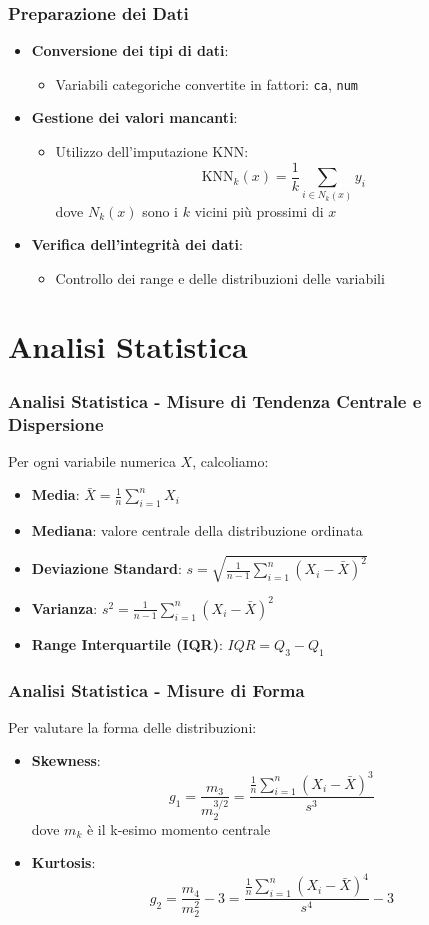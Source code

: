 \documentclass{beamer}
\begin{document}
\begin{frame}
\frametitle{Preparazione dei Dati}
\begin{itemize}
    \item \textbf{Conversione dei tipi di dati}:
    \begin{itemize}
        \item Variabili categoriche convertite in fattori: \texttt{ca}, \texttt{num}
    \end{itemize}
    \item \textbf{Gestione dei valori mancanti}:
    \begin{itemize}
        \item Utilizzo dell'imputazione KNN:
        \[\text{KNN}_k(x) = \frac{1}{k}\sum_{i \in N_k(x)} y_i\]
        dove $N_k(x)$ sono i $k$ vicini più prossimi di $x$
    \end{itemize}
    \item \textbf{Verifica dell'integrità dei dati}:
    \begin{itemize}
        \item Controllo dei range e delle distribuzioni delle variabili
    \end{itemize}
\end{itemize}
\end{frame}

\section{Analisi Statistica}

\begin{frame}
\frametitle{Analisi Statistica - Misure di Tendenza Centrale e Dispersione}
Per ogni variabile numerica $X$, calcoliamo:
\begin{itemize}
    \item \textbf{Media}: $\bar{X} = \frac{1}{n}\sum_{i=1}^n X_i$
    \item \textbf{Mediana}: valore centrale della distribuzione ordinata
    \item \textbf{Deviazione Standard}: $s = \sqrt{\frac{1}{n-1}\sum_{i=1}^n (X_i - \bar{X})^2}$
    \item \textbf{Varianza}: $s^2 = \frac{1}{n-1}\sum_{i=1}^n (X_i - \bar{X})^2$
    \item \textbf{Range Interquartile (IQR)}: $IQR = Q_3 - Q_1$
\end{itemize}
\end{frame}

\begin{frame}
\frametitle{Analisi Statistica - Misure di Forma}
Per valutare la forma delle distribuzioni:
\begin{itemize}
    \item \textbf{Skewness}: 
    \[g_1 = \frac{m_3}{m_2^{3/2}} = \frac{\frac{1}{n}\sum_{i=1}^n (X_i - \bar{X})^3}{s^3}\]
    dove $m_k$ è il k-esimo momento centrale
    \item \textbf{Kurtosis}: 
    \[g_2 = \frac{m_4}{m_2^2} - 3 = \frac{\frac{1}{n}\sum_{i=1}^n (X_i - \bar{X})^4}{s^4} - 3\]
\end{itemize}
\end{frame}
\end{document}
